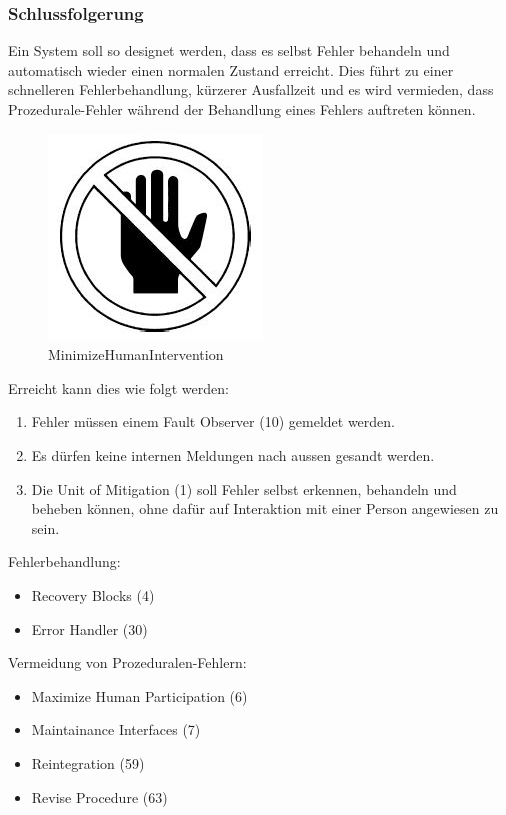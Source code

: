 \subsubsection*{Schlussfolgerung}

Ein System soll so designet werden, dass es selbst Fehler behandeln und automatisch wieder einen normalen Zustand erreicht. Dies führt zu einer schnelleren Fehlerbehandlung, kürzerer Ausfallzeit und es wird vermieden, dass Prozedurale-Fehler während der Behandlung eines Fehlers auftreten können.

\begin{figure}[H]
	\centering
	\includegraphics{content/faulttolerance/images/MinimizeHumanIntervention.JPG}
	\caption{MinimizeHumanIntervention}
\end{figure}


Erreicht kann dies wie folgt werden:
\begin{enumerate}
	\item Fehler müssen einem Fault Observer (10) gemeldet werden.
	\item Es dürfen keine internen Meldungen nach aussen gesandt werden.
	\item Die Unit of Mitigation (1) soll Fehler selbst erkennen, behandeln und beheben können, ohne dafür auf Interaktion mit einer Person angewiesen zu sein.
\end{enumerate}

Fehlerbehandlung:
\begin{itemize}
	\item Recovery Blocks (4)
	\item Error Handler (30)
\end{itemize}

Vermeidung von Prozeduralen-Fehlern:
\begin{itemize}
	\item Maximize Human Participation (6)
	\item Maintainance Interfaces (7)
	\item Reintegration (59)
	\item Revise Procedure (63)
\end{itemize}

